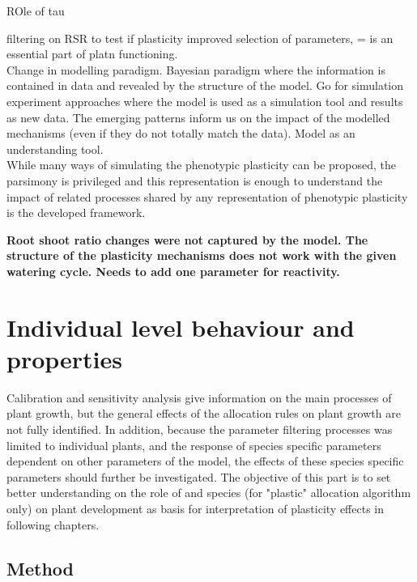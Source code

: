 ROle of tau

filtering on RSR to test if plasticity improved selection of parameters, = is an essential part of platn functioning.\\
Change in modelling paradigm. Bayesian paradigm where the information is contained in data and revealed by the structure of the model. Go for simulation experiment approaches where the model is used as a simulation tool and results as new data. The emerging patterns inform us on the impact of the modelled mechanisms (even if they do not totally match the data). Model as an understanding tool.\\
While many ways of simulating the phenotypic plasticity can be proposed, the parsimony is privileged and this representation is enough to understand the impact of related processes shared by any representation of phenotypic plasticity is the developed framework.

\textbf{Root shoot ratio changes were not captured by the model. The structure of the plasticity mechanisms does not work with the given watering cycle. Needs to add one parameter for reactivity.}

\section{Individual level behaviour and properties}


Calibration and sensitivity analysis give information on the main processes of plant growth, but the general effects of the allocation rules on plant growth are not fully identified. In addition, because the parameter filtering processes was limited to individual plants, and the response of species specific parameters dependent on other parameters of the model, the effects of these species specific parameters should further be investigated. The objective of this part is to set better understanding on the role of  and species  (for "plastic" allocation algorithm only) on plant development as basis for interpretation of plasticity effects in following chapters.


\subsection{Method}




